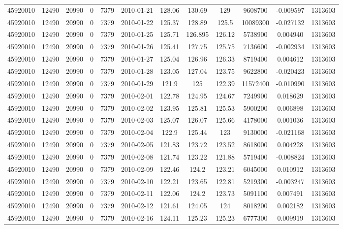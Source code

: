 \documentclass[12 pt]{article}
\begin{document}
\begin{flushleft}
\begin{table}[h]
\begin{tabular}{c c c c c c c c c c c c }
45920010 & 12490 & 20990 & 0 & 7379 & 2010-01-21 & 128.06 & 130.69 & 129 & 9608700 & -0.009597 & 1313603\\
45920010 & 12490 & 20990 & 0 & 7379 & 2010-01-22 & 125.37 & 128.89 & 125.5 & 10089300 & -0.027132 & 1313603\\
45920010 & 12490 & 20990 & 0 & 7379 & 2010-01-25 & 125.71 & 126.895 & 126.12 & 5738900 & 0.004940 & 1313603\\
45920010 & 12490 & 20990 & 0 & 7379 & 2010-01-26 & 125.41 & 127.75 & 125.75 & 7136600 & -0.002934 & 1313603\\
45920010 & 12490 & 20990 & 0 & 7379 & 2010-01-27 & 125.04 & 126.96 & 126.33 & 8719400 & 0.004612 & 1313603\\
45920010 & 12490 & 20990 & 0 & 7379 & 2010-01-28 & 123.05 & 127.04 & 123.75 & 9622800 & -0.020423 & 1313603\\
45920010 & 12490 & 20990 & 0 & 7379 & 2010-01-29 & 121.9 & 125 & 122.39 & 11572400 & -0.010990 & 1313603\\
45920010 & 12490 & 20990 & 0 & 7379 & 2010-02-01 & 122.78 & 124.95 & 124.67 & 7249900 & 0.018629 & 1313603\\
45920010 & 12490 & 20990 & 0 & 7379 & 2010-02-02 & 123.95 & 125.81 & 125.53 & 5900200 & 0.006898 & 1313603\\
45920010 & 12490 & 20990 & 0 & 7379 & 2010-02-03 & 125.07 & 126.07 & 125.66 & 4178000 & 0.001036 & 1313603\\
45920010 & 12490 & 20990 & 0 & 7379 & 2010-02-04 & 122.9 & 125.44 & 123 & 9130000 & -0.021168 & 1313603\\
45920010 & 12490 & 20990 & 0 & 7379 & 2010-02-05 & 121.83 & 123.72 & 123.52 & 8618000 & 0.004228 & 1313603\\
45920010 & 12490 & 20990 & 0 & 7379 & 2010-02-08 & 121.74 & 123.22 & 121.88 & 5719400 & -0.008824 & 1313603\\
45920010 & 12490 & 20990 & 0 & 7379 & 2010-02-09 & 122.46 & 124.2 & 123.21 & 6045000 & 0.010912 & 1313603\\
45920010 & 12490 & 20990 & 0 & 7379 & 2010-02-10 & 122.21 & 123.65 & 122.81 & 5219300 & -0.003247 & 1313603\\
45920010 & 12490 & 20990 & 0 & 7379 & 2010-02-11 & 122.06 & 124.2 & 123.73 & 5091100 & 0.007491 & 1313603\\
45920010 & 12490 & 20990 & 0 & 7379 & 2010-02-12 & 121.61 & 124.05 & 124 & 8018200 & 0.002182 & 1313603\\
45920010 & 12490 & 20990 & 0 & 7379 & 2010-02-16 & 124.11 & 125.23 & 125.23 & 6777300 & 0.009919 & 1313603\\

\end{tabular}
\end{table}
\end{flushleft}
\end{document}
